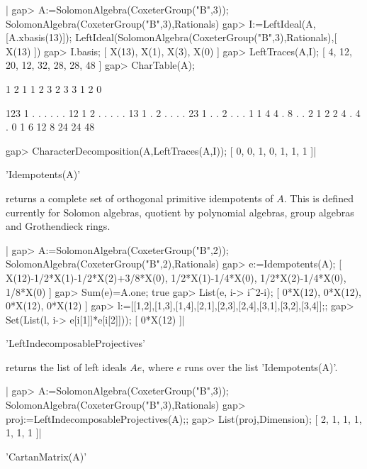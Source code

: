 |    gap> A:=SolomonAlgebra(CoxeterGroup("B",3));
    SolomonAlgebra(CoxeterGroup("B",3),Rationals)
    gap> I:=LeftIdeal(A,[A.xbasis(13)]);
    LeftIdeal(SolomonAlgebra(CoxeterGroup("B",3),Rationals),[ X(13) ])
    gap> I.basis;
    [ X(13), X(1), X(3), X(0) ]
    gap> LeftTraces(A,I);
    [ 4, 12, 20, 12, 32, 28, 28, 48 ]
    gap> CharTable(A);

          1
          2  1   1  2
          3  2   3  3   1   2   0

    123   1  .   .  .   .   .   .
     12   1  2   .  .   .   .   .
     13   1  .   2  .   .   .   .
     23   1  .   .  2   .   .   .
      1   1  4   4  .   8   .   .
      2   1  2   2  4   .   4   .
      0   1  6  12  8  24  24  48

    gap> CharacterDecomposition(A,LeftTraces(A,I));
    [ 0, 0, 1, 0, 1, 1, 1 ]|

'Idempotents(A)'

returns  a complete set of orthogonal primitive idempotents of $A$. This is
defined  currently for  Solomon algebras,  quotient by polynomial algebras,
group algebras and Grothendieck rings.

|    gap> A:=SolomonAlgebra(CoxeterGroup("B",2));
    SolomonAlgebra(CoxeterGroup("B",2),Rationals)
    gap> e:=Idempotents(A);
    [ X(12)-1/2*X(1)-1/2*X(2)+3/8*X(0), 1/2*X(1)-1/4*X(0),
      1/2*X(2)-1/4*X(0), 1/8*X(0) ]
    gap> Sum(e)=A.one;
    true
    gap> List(e, i-> i^2-i);
    [ 0*X(12), 0*X(12), 0*X(12), 0*X(12) ]
    gap> l:=[[1,2],[1,3],[1,4],[2,1],[2,3],[2,4],[3,1],[3,2],[3,4]];;
    gap> Set(List(l, i-> e[i[1]]*e[i[2]]));
    [ 0*X(12) ]|

'LeftIndecomposableProjectives'

returns  the  list  of  left  ideals  $Ae$,  where  $e$  runs over the list
'Idempotents(A)'.

|    gap> A:=SolomonAlgebra(CoxeterGroup("B",3));
    SolomonAlgebra(CoxeterGroup("B",3),Rationals)
    gap> proj:=LeftIndecomposableProjectives(A);;
    gap> List(proj,Dimension);
    [ 2, 1, 1, 1, 1, 1, 1 ]|

'CartanMatrix(A)'

